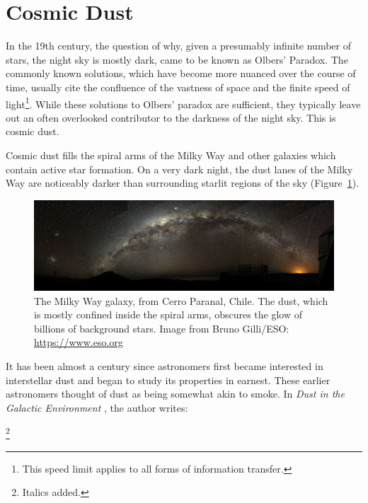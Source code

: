 \section{Cosmic Dust}

In the 19th century, the question of why, given a presumably infinite number of stars, the night sky is mostly dark, came to be known as Olbers' Paradox. The commonly known solutions, which have become more nuanced over the course of time, usually cite the confluence of the vastness of space and the finite speed of light\footnote{This speed limit applies to all forms of information transfer.}. While these solutions to Olbers' paradox are sufficient, they typically leave out an often overlooked contributor to the darkness of the night sky. This is cosmic dust.

Cosmic dust fills the spiral arms of the Milky Way and other galaxies which contain active star formation. On a very dark night, the dust lanes of the Milky Way are noticeably darker than surrounding starlit regions of the sky (Figure~\ref{fig:MW}).

\begin{figure}[!htbp]
\centering
\includegraphics[width=\textwidth]{figures/intro/Milky_Way_Arch}
\caption[~The dust lane of the Milky Way galaxy.]{The Milky Way galaxy, from Cerro Paranal, Chile. The dust, which is mostly confined inside the spiral arms, obscures the glow of billions of background stars. Image from Bruno Gilli/ESO: \url{https://www.eso.org}}
\label{fig:MW}
\end{figure}

It has been almost a century since astronomers first became interested in interstellar dust and began to study its properties in earnest. These earlier astronomers thought of dust as being somewhat akin to smoke. In \textit{Dust in the Galactic Environment} \citep{whittet2002dust}, the author writes:

\footnote{Italics added.}

